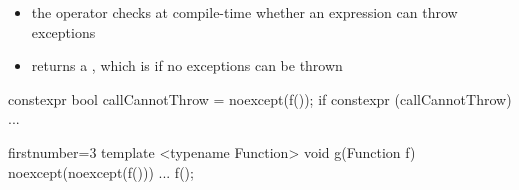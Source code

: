 \begin{advanced}
\begin{frame}[fragile]
  \begin{block}{}
    \begin{itemize}
      \item the  operator checks at compile-time whether an expression can throw exceptions
      \item returns a , which is  if no exceptions can be thrown
    \end{itemize}
  \end{block}
  \begin{block}{}
    \begin{cppcode*}{}
      constexpr bool callCannotThrow = noexcept(f());
      if constexpr (callCannotThrow) { ... }
    \end{cppcode*}
  \end{block}
  \begin{block}{}
    \begin{cppcode*}{firstnumber=3}
      template <typename Function>
      void g(Function f) noexcept(noexcept(f())) {
        ...
        f();
      }
    \end{cppcode*}
  \end{block}
\end{frame}


\end{advanced}
